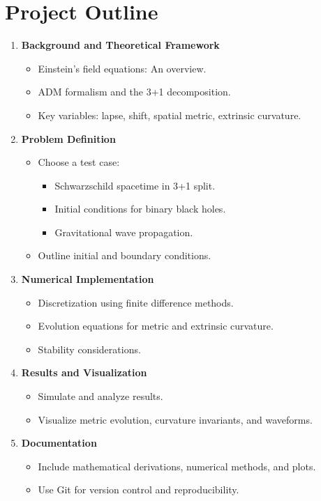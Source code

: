 \documentclass[12pt]{article}
\begin{document}
\section{Project Outline}
\begin{enumerate}
    \item \textbf{Background and Theoretical Framework}
    \begin{itemize}
        \item Einstein's field equations: An overview.
        \item ADM formalism and the 3+1 decomposition.
        \item Key variables: lapse, shift, spatial metric, extrinsic curvature.
    \end{itemize}
    \item \textbf{Problem Definition}
    \begin{itemize}
        \item Choose a test case:
        \begin{itemize}
            \item Schwarzschild spacetime in 3+1 split.
            \item Initial conditions for binary black holes.
            \item Gravitational wave propagation.
        \end{itemize}
        \item Outline initial and boundary conditions.
    \end{itemize}
    \item \textbf{Numerical Implementation}
    \begin{itemize}
        \item Discretization using finite difference methods.
        \item Evolution equations for metric and extrinsic curvature.
        \item Stability considerations.
    \end{itemize}
    \item \textbf{Results and Visualization}
    \begin{itemize}
        \item Simulate and analyze results.
        \item Visualize metric evolution, curvature invariants, and waveforms.
    \end{itemize}
    \item \textbf{Documentation}
    \begin{itemize}
        \item Include mathematical derivations, numerical methods, and plots.
        \item Use Git for version control and reproducibility.
    \end{itemize}
\end{enumerate}
\end{document}
